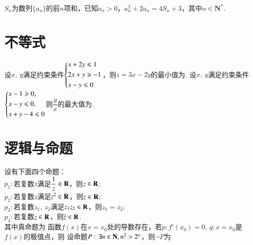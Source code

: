 \documentclass{BHCexam}
\begin{document}
\begin{questions}
\question
$S_n$为数列$\{a_n\}$的前$n$项和，已知$a_n>0$，$a_n^2+2a_n=4S_n+3$，其中$n\in \mathbf{N}^*$.

\end{questions}





\section{不等式}
\begin{questions}
	\qs 设$x,~y$满足约束条件$\begin{dcases}
	x+2y\le1\\
	2x+y\ge-1\\
	x-y\le0
	\end{dcases}$，则$ z=3x-2y $的最小值为\tk.
	\qs 设$x,~y$满足约束条件$\begin{dcases}
	x-1\ge0,\\
	x-y\le 0,\\
	x+y-4\le 0
	\end{dcases}$则$ \dfrac{y}{x} $的最大值为\tk.
\end{questions}




\section{逻辑与命题}
\begin{questions}
	\qs 设有下面四个命题：\\
	$p_1:$若复数$ z $满足$\dfrac1z\inR$，则$ z\inR $;\\
	$p_2:$若复数$z$满足$ z^2\inR $，则$ z\inR $;\\
	$p_3:$若复数$z_1,~z_2$满足$ z_1z_2\inR $，则$ z_1=\overline{z_2} $;\\
	$p_4:$若复数$ z\inR $，则$ \overline{z}\inR $.\\
	其中真命题为\xx
	\qs 函数$f(x)$在$ x=x_0 $处的导数存在，若$ p:f'(x_0)=0,~q:x=x_0 $是$f(x)$的极值点，则\xx
	\qs 设命题$ P:\exists n\inN ,n^2>2^n$，则$ \neg P $为\xx
\end{questions}
\end{document}
